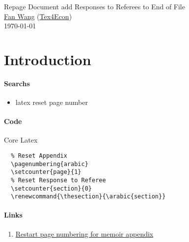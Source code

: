 \documentclass[12pt,english]{article}
\begin{document}
\begingroup
  \centering
  \LARGE Repage Document add Responses to Referees to End of File \\[1.5em]
  \large \href{http://fanwangecon.github.io/}{Fan Wang} (\href{http://fanwangecon.github.io/Tex4Econ}{Tex4Econ}) \\[1.5em]
  \large \today \par
\endgroup

\begin{abstract}
We paginate the main body of the file, re-paginate appendix with letter section headings, then re-paginate a post appendix section with numeric section headings. Final section could be appended file response to referees, which is included with main file to allow for consistent table and graph referencing and citations, but then should be split out as separate file afterwards.
\end{abstract}

\section{Introduction}

\paragraph{Searchs}
\begin{itemize}
  \item latex reset page number
\end{itemize}

\paragraph{Code} Core Latex

\begin{lstlisting}
  % Reset Appendix
  \pagenumbering{arabic}
  \setcounter{page}{1}
  % Reset Response to Referee
  \setcounter{section}{0}
  \renewcommand{\thesection}{\arabic{section}}
\end{lstlisting}

\paragraph{Links}
\begin{enumerate}
  \item \href{https://tex.stackexchange.com/questions/259085/restart-page-numbering-for-memoir-appendix}{Restart page numbering for memoir appendix}
\end{enumerate}
\end{document}
